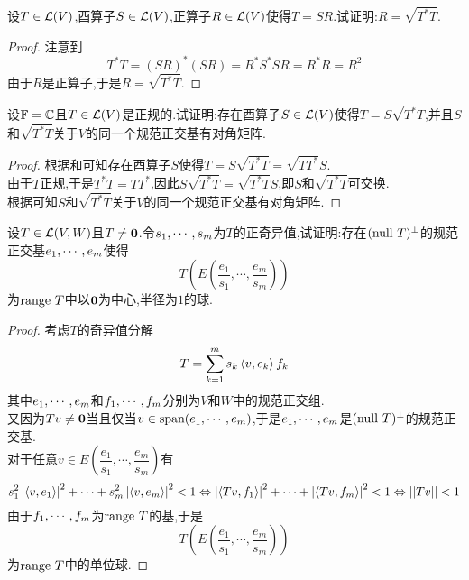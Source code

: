 \documentclass{ctexart}
\begin{document}
\begin{problem}[30.]
    设$T\in\mathcal{L}(V)$,酉算子$S\in\mathcal{L}(V)$,正算子$R\in\mathcal{L}(V)$使得$T=SR$.试证明:$R=\sqrt{T^*T}$.
\end{problem}
\begin{proof}
    注意到
    \[T^*T=(SR)^*(SR)=R^*S^*SR=R^*R=R^2\]
    由于$R$是正算子,于是$R=\sqrt{T^*T}$.
\end{proof}
\begin{problem}[31.]
    设$\mathbb{F}=\mathbb{C}$且$T\in\mathcal{L}(V)$是正规的.试证明:存在酉算子$S\in\mathcal{L}(V)$使得$T=S\sqrt{T^*T}$,并且$S$和$\sqrt{T^*T}$关于$V$的同一个规范正交基有对角矩阵.
\end{problem}
\begin{proof}
    根据和可知存在酉算子$S$使得$T=S\sqrt{T^*T}=\sqrt{TT^*}S$.\\
    由于$T$正规,于是$T^*T=TT^*$,因此$S\sqrt{T^*T}=\sqrt{T^*T}S$,即$S$和$\sqrt{T^*T}$可交换.\\
    根据可知$S$和$\sqrt{T^*T}$关于$V$的同一个规范正交基有对角矩阵.
\end{proof}
\begin{problem}[32.]
    设$T\in\mathcal{L}(V,W)$且$T\neq\mathbf0$.令${s}_1,\cdots,{s}_{m}$为$T$的正奇异值,试证明:存在$(\text{null } T)^\bot$的规范正交基${e}_1,\cdots,{e}_{m}$使得
    \[T\left(E\left(\dfrac{e_1}{s_1},\cdots,\dfrac{e_m}{s_m}\right)\right)\]
    为$\text{range } T$中以$\mathbf0$为中心,半径为$1$的球.
\end{problem}
\begin{proof}
    考虑$T$的奇异值分解
    \[T=\sum_{k=1}^ms_k\left\langle{v},{e_k}\right\rangle f_k\]
    其中${e}_1,\cdots,{e}_{m}$和${f}_1,\cdots,{f}_{m}$分别为$V$和$W$中的规范正交组.\\
    又因为$Tv\neq\mathbf0$当且仅当$v\in\text{span}({e}_1,\cdots,{e}_{m})$,于是${e}_1,\cdots,{e}_{m}$是$(\text{null } T)^\bot$的规范正交基.\\
    对于任意$v\in E\left(\dfrac{e_1}{s_1},\cdots,\dfrac{e_m}{s_m}\right)$有
    \[s_1^2\left|\left\langle{v},{e_1}\right\rangle\right|^2+\cdots+s_m^2\left|\left\langle{v},{e_m}\right\rangle\right|^2<1
    \Leftrightarrow \left|\left\langle{Tv},{f_1}\right\rangle\right|^2+\cdots+\left|\left\langle{Tv},{f_m}\right\rangle\right|^2<1
    \Leftrightarrow ||Tv||<1\]
    由于${f}_1,\cdots,{f}_{m}$为$\text{range } T$的基,于是
    \[T\left(E\left(\dfrac{e_1}{s_1},\cdots,\dfrac{e_m}{s_m}\right)\right)\]
    为$\text{range } T$中的单位球.
\end{proof}
\end{document}
